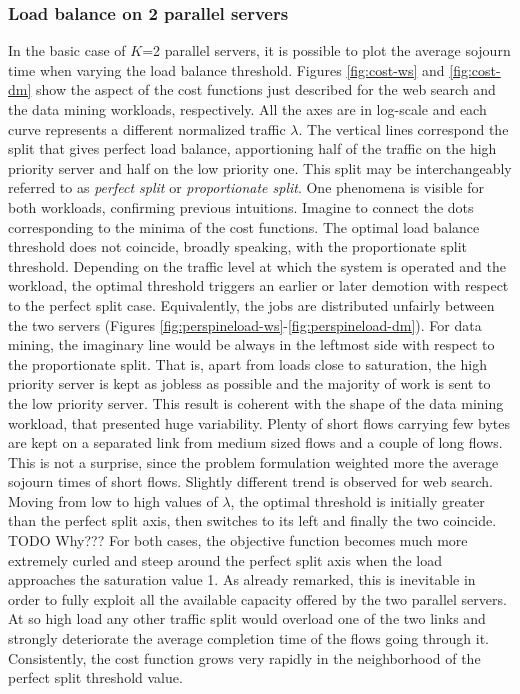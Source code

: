 \subsubsection{Load balance on 2 parallel servers}
In the basic case of $K$=2 parallel servers, it is possible to plot the average sojourn time when varying the load balance threshold. Figures \ref{fig:cost-ws} and \ref{fig:cost-dm} show the aspect of the cost functions just described for the web search and the data mining workloads, respectively. All the axes are in log-scale and each curve represents a different normalized traffic $\lambda$. The vertical lines correspond the split that gives perfect load balance, apportioning half of the traffic on the high priority server and half on the low priority one. This split may be interchangeably referred to as \emph{perfect split} or \emph{proportionate split}. One phenomena is visible for both workloads, confirming previous intuitions. Imagine to connect the dots corresponding to the minima of the cost functions. The optimal load balance threshold does not coincide, broadly speaking, with the proportionate split threshold. Depending on the traffic level at which the system is operated and the workload, the optimal threshold triggers an earlier or later demotion with respect to the perfect split case. Equivalently, the jobs are distributed unfairly between the two servers (Figures \ref{fig:perspineload-ws}-\ref{fig:perspineload-dm}). For data mining, the imaginary line would be always in the leftmost side with respect to the proportionate split. That is, apart from loads close to saturation, the high priority server is kept as jobless as possible and the majority of work is sent to the low priority server. This result is coherent with the shape of the data mining workload, that presented huge variability. Plenty of short flows carrying few bytes are kept on a separated link from medium sized flows and a couple of long flows. This is not a surprise, since the problem formulation weighted more the average sojourn times of short flows. Slightly different trend is observed for web search. Moving from low to high values of $\lambda$, the optimal threshold is initially greater than the perfect split axis, then switches to its left and finally the two coincide. TODO Why??? For both cases, the objective function becomes much more extremely curled and steep around the perfect split axis when the load approaches the saturation value 1.  As already remarked, this is inevitable in order to fully exploit all the available capacity offered by the two parallel servers. At so high load any other traffic split would overload one of the two links and strongly deteriorate the average completion time of the flows going through it. Consistently, the cost function grows very rapidly in the neighborhood of the perfect split threshold value. \\
